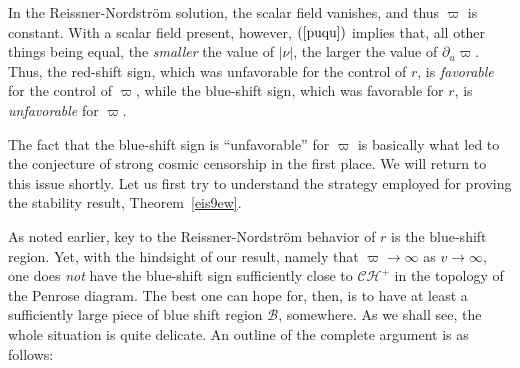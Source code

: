 \documentclass{article}
\begin{document}
{In the Reissner-Nordstr\"om solution, the scalar field
vanishes, and thus $\varpi$ is constant. 
With a scalar field present, however, 
$(\ref{puqu})$ implies that, all other things being equal, 
the \emph{smaller} the value of
$|\nu|$, the larger the value of $\partial_u\varpi$.
Thus, the red-shift sign, which was unfavorable for
the control of $r$, is \emph{favorable} for the control of $\varpi$,
while the blue-shift sign, which was favorable for
$r$, is \emph{unfavorable} for $\varpi$.

The fact that the blue-shift sign is ``unfavorable'' for
$\varpi$ is basically what led to the conjecture of strong
cosmic censorship in the first place.
We will return to this issue shortly. Let us first try to
understand the strategy employed
for proving the stability result, Theorem~\ref{eis9ew}.
 
As noted earlier, key to the Reissner-Nordstr\"om behavior of
$r$ is the blue-shift region. Yet, with the hindsight of our result,
namely that $\varpi\to\infty$ as $v\to\infty$, one
does \emph{not} have the blue-shift sign sufficiently
close to $\mathcal{CH}^+$ in the topology of the Penrose
diagram. The best one can hope for, then, is to have
at least a sufficiently
large piece of blue shift region $\mathcal{B}$, somewhere.
As we shall see, the whole situation is quite delicate. An outline of
the complete argument is as follows:

}
\end{document}
